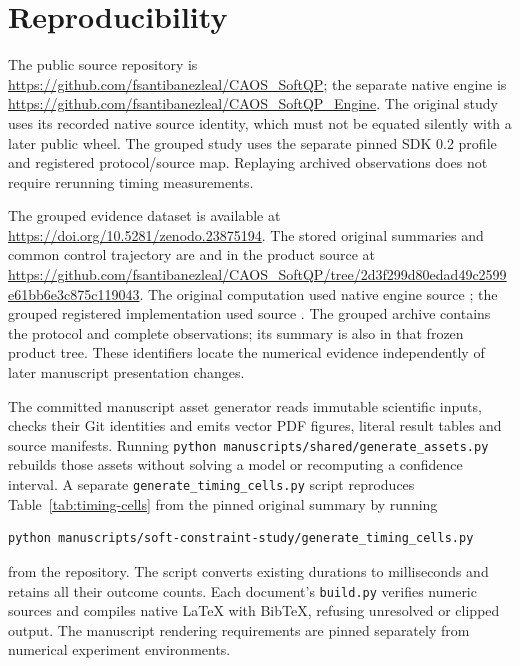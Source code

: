 \section{Reproducibility}\label{sec:reproducibility}
The public source repository is
\url{https://github.com/fsantibanezleal/CAOS_SoftQP}; the separate native engine
is \url{https://github.com/fsantibanezleal/CAOS_SoftQP_Engine}.
The original study uses its recorded native source identity, which must not
be equated silently with a later public wheel. The grouped study uses the
separate pinned SDK 0.2 profile and registered protocol/source map. Replaying
archived observations does not require rerunning timing measurements.

The grouped evidence dataset is available at
\url{https://doi.org/10.5281/zenodo.23875194}. The stored original summaries %
and common control trajectory are  %
and  in the product source at
\url{https://github.com/fsantibanezleal/CAOS_SoftQP/tree/2d3f299d80edad49c2599e61bb6e3c875c119043}.
The original computation used native engine source
; the grouped registered
implementation used source .
The grouped archive contains the protocol and complete observations; its
summary is also 
in that frozen product tree. These identifiers locate the numerical evidence
independently of later manuscript presentation changes.

The committed manuscript asset generator reads immutable scientific inputs,
checks their Git identities and emits vector PDF figures, literal result
tables and source manifests. Running
\texttt{python manuscripts/shared/generate\_assets.py} rebuilds those assets
without solving a model or recomputing a confidence interval. A separate
\texttt{generate\_timing\_cells.py} script reproduces
Table~\ref{tab:timing-cells} from the pinned original summary by running
\begin{verbatim}
python manuscripts/soft-constraint-study/generate_timing_cells.py
\end{verbatim}
from the repository. The script converts existing durations to milliseconds
and retains all their outcome counts.
Each document's
\texttt{build.py} verifies numeric sources and compiles native LaTeX with
BibTeX, refusing unresolved or clipped output. The manuscript rendering
requirements are pinned separately from numerical experiment environments.

